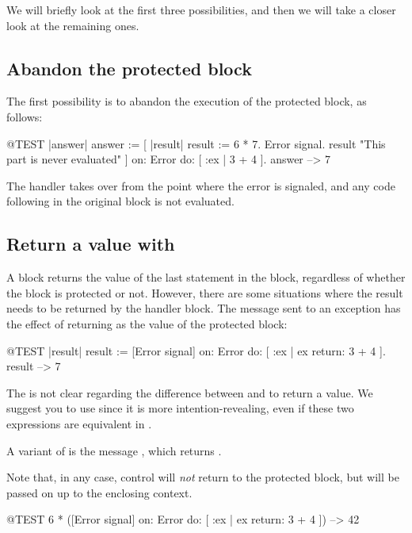 \documentclass[a4paper,10pt,twoside]{book}
\begin{document}
We will briefly look at the first three possibilities, and then we will take a closer look at the remaining ones.

\subsection{Abandon the protected block}

The first possibility is to abandon the execution of the protected block, as follows:
\begin{code}{@TEST |answer|}
answer := [ |result|
	result := 6 * 7.
	Error signal.
	result 	"This part is never evaluated"
]	on: Error
	do: [ :ex | 3 + 4 ].
answer --> 7
\end{code}

The handler takes over from the point where the error is signaled, and any code following in the original block is not evaluated.

\subsection{Return a value with }
A block returns the value of the last statement in the block, regardless of whether the block is protected or not. However, there are some situations where the result needs to be returned by the handler block. The message  sent to an exception has the effect of returning  as the value of the protected block:

\begin{code}{@TEST |result|}
result := [Error signal]
	on: Error
	do: [ :ex | ex return: 3 + 4 ].
result --> 7
\end{code}

The  is not clear regarding the difference between  and  to return a value. We suggest you to use  since it is more intention-revealing, even if these two expressions are equivalent in \pharo.

A variant of  is the message , which returns . 

Note that, in any case, control will \emph{not} return to the protected block, but will be passed on up to the enclosing context.

\begin{code}{@TEST}
6 * ([Error signal] on: Error do: [ :ex | ex return: 3 + 4 ]) --> 42
\end{code}
\end{document}
